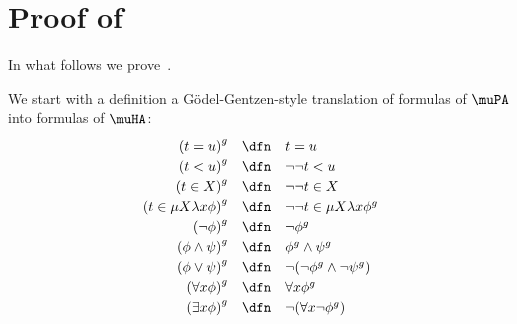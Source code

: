 \section{Proof of }

\label{sec:conservativity-via-double-negation}


\newcommand{\godelgentz}[1]{{#1}^{g}}
\newcommand{\friedman}[1]{{#1}^\rho}

In what follows we prove~.

% 
% 
We start with a definition a G\"{o}del-Gentzen-style translation of formulas of $\muPA$ into formulas of $\muHA$:
\[
\def\arraystretch{1.2}
\begin{array}{rcl}
    \godelgentz {(t=u)}  & \dfn & t=u \\
  \godelgentz {(t<u)}  & \dfn & \neg \neg t<u\\
  \godelgentz {(t \in X)} & \dfn & \neg \neg t \in X\\
  \godelgentz {(t \in \mu X\lambda x\phi)} & \dfn & \neg \neg t \in \mu X\lambda x\godelgentz{\phi} \\
\godelgentz {(\neg \phi)} & \dfn & \neg \godelgentz{\phi}\\
 \godelgentz {(\phi \wedge \psi)} & \dfn &  \godelgentz{\phi}\wedge \godelgentz{\psi}\\
  \godelgentz {(\phi \vee \psi)} & \dfn & \neg(\neg \godelgentz{\phi}\wedge \neg \godelgentz{\psi})\\
\godelgentz{(\forall x\phi)}  & \dfn & \forall x\godelgentz{\phi}\\
 \godelgentz{(\exists x\phi)} & \dfn & \neg (\forall x\neg \godelgentz{\phi})
\end{array}
\]

